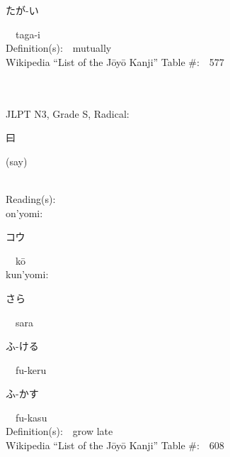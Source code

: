 \begin{multicols}{2}
{\hspace*{2em}}{\begin{CJK}{UTF8}{min} たが-い \end{CJK}}\ \ taga-i\ \ \\
Definition(s):\ \ mutually \\
Wikipedia ``List of the J\=oy\=o Kanji'' Table \#:\ \ 577 \\
\ \ \\
{\fontsize{34pt}{40pt}  }\ \ \\  %
{JLPT N3, Grade S, Radical:\ \ {\begin{CJK}{UTF8}{min} 曰 \end{CJK}} (say) } \\
Reading(s):\ \ \\
{\hspace*{1em}}on'yomi:\ \ \\
{\hspace*{2em}}{\begin{CJK}{UTF8}{min} コウ \end{CJK}}\ \ k\=o\ \ \\
{\hspace*{1em}}kun'yomi:\ \ \\
{\hspace*{2em}}{\begin{CJK}{UTF8}{min} さら \end{CJK}}\ \ sara\ \ \\
{\hspace*{2em}}{\begin{CJK}{UTF8}{min} ふ-ける \end{CJK}}\ \ fu-keru\ \ \\
{\hspace*{2em}}{\begin{CJK}{UTF8}{min} ふ-かす \end{CJK}}\ \ fu-kasu\ \ \\
Definition(s):\ \ grow late \\
Wikipedia ``List of the J\=oy\=o Kanji'' Table \#:\ \ 608 \\
\ \ \\
{\fontsize{34pt}{40pt}  }\ \ \\  %

\end{multicols}
